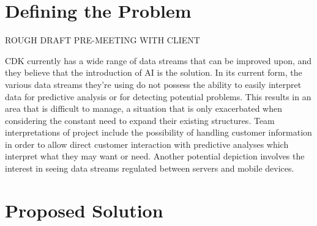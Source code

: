 \documentclass[onecolumn, draftclsnofoot,10pt, compsoc]{IEEEtran}
\begin{document}
\newpage
{}
\tableofcontents
\clearpage

\section{Defining the Problem}
	ROUGH DRAFT PRE-MEETING WITH CLIENT
	
	CDK currently has a wide range of data streams that can be improved upon, and they believe that the introduction of AI is the solution. In its current form, the various data streams they’re using do not possess the ability to easily interpret data for predictive analysis or for detecting potential problems. This results in an area that is difficult to manage, a situation that is only exacerbated when considering the constant need to expand their existing structures.  Team interpretations of project include the possibility of handling customer information in order to allow direct customer interaction with predictive analyses which interpret what they may want or need. Another potential depiction involves the interest in seeing data streams regulated between servers and mobile devices.
	
\section{Proposed Solution}
\end{document}
